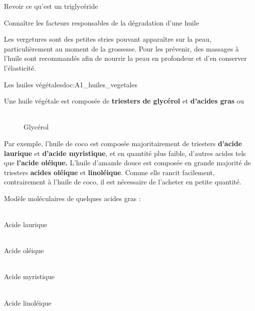 \teteTermStssAlim



\begin{objectifs}
  \item Revoir ce qu'est un triglycéride
  \item Connaître les facteurs responsables de la dégradation d'une huile
\end{objectifs}

\begin{contexte}
  Les vergetures sont des petites stries pouvant apparaître sur la peau, particulièrement au moment de la grossesse. 
  Pour les prévenir, des massages à l’huile sont recommandés afin de nourrir la peau en profondeur et d’en conserver l’élasticité.
  
\end{contexte}


\begin{doc}{Les huiles végétales}{doc:A1_huiles_vegetales}
  \begin{encart}
    Une huile végétale est composée de \textbf{triesters de glycérol} et \textbf{d'acides gras}  ou 
  \end{encart}
  
  \begin{wrapfigure}{r}{0.22\linewidth}
    \centering
     \\[4pt]
    {\small Glycérol}
  \end{wrapfigure}
  
  Par exemple, l'huile de coco est composée majoritairement de triesters \textbf{d'acide laurique} et \textbf{d'acide myristique}, et en quantité plus faible, d'autres acides tels que \textbf{l'acide oléique.}
  L'huile d'amande douce est composée en grande majorité de triesters \textbf{acides oléique} et \textbf{linoléique}.
  Comme elle rancit facilement, contrairement à l'huile de coco, il est nécessaire de l'acheter en petite quantité.
  
  \begin{center}
    Modèle moléculaires de quelques acides gras :
  \end{center}
  \vspace*{-24pt}
  \begin{multicols}{2}
    \centering
     \\
    {\small Acide laurique}
    
     \\
    {\small Acide oléique}
    
     \\
    {\small Acide myristique}
    
     \\
    {\small Acide linoléique}
  \end{multicols}
\end{doc}

